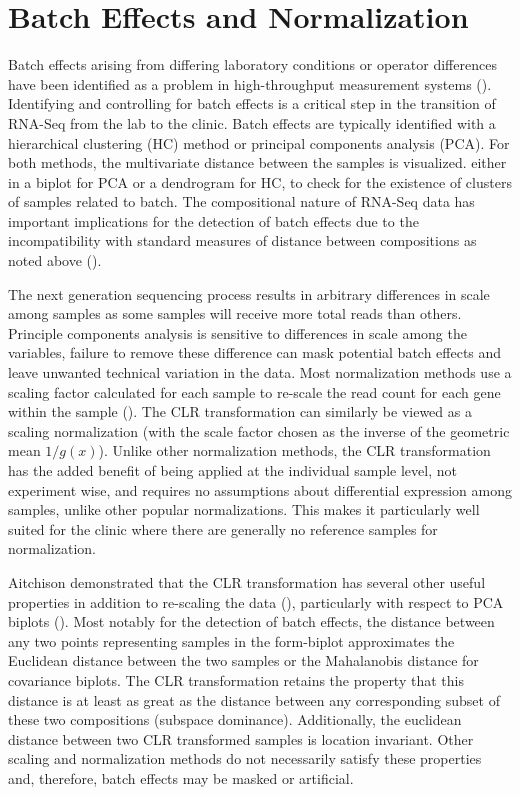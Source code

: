 \documentclass [10pt]{article}
\theoremstyle{definition}
\begin{document}
\FloatBarrier
\section{Batch Effects and Normalization}

Batch effects arising from differing laboratory conditions or operator differences have been identified as a problem in high-throughput measurement systems (\cite{leek2010, chen2011}).  Identifying and controlling for batch effects is a critical step in the transition of RNA-Seq from the lab to the clinic.  Batch effects are typically identified with a hierarchical clustering (HC) method or principal components analysis (PCA).  For both methods, the multivariate distance between the samples is visualized. either in a biplot for PCA or a dendrogram for HC, to check for the existence of clusters of samples related to batch. %
The compositional nature of RNA-Seq data has important implications for the detection of batch effects due to the incompatibility with standard measures of distance between compositions as noted above (\cite{Aitchison1986,Martin-Fernandez1998}).

The next generation sequencing process results in arbitrary differences in scale among samples as some samples will receive more total reads than others. Principle components analysis is sensitive to differences in scale among the variables, failure to remove these difference can mask potential batch effects and leave unwanted technical variation in the data.  Most normalization methods use a scaling factor calculated for each sample to re-scale the read count for each gene within the sample (\cite{Dillies2013}).  The CLR transformation can similarly be viewed as a scaling normalization (with the scale factor chosen as the inverse of the geometric mean $1/g(x)$).  Unlike other normalization methods, the CLR transformation has the added benefit of being applied at the individual sample level, not experiment wise, and requires no assumptions about differential expression among samples, unlike other popular normalizations.  This makes it particularly well suited for the clinic where there are generally no reference samples for normalization.

Aitchison demonstrated that the CLR transformation has several other useful properties in addition to re-scaling the data (\cite{Aitchison1986}), particularly with respect to PCA biplots (\cite{Aitchison2002}).  Most notably for the detection of batch effects, the distance between any two points representing samples in the form-biplot approximates the Euclidean distance between the two samples or the Mahalanobis distance for covariance biplots.  The CLR transformation retains the property that this distance is at least as great as the distance between any corresponding subset of these two compositions (subspace dominance).  Additionally, the euclidean distance between two CLR transformed samples is location invariant. Other scaling and normalization methods do not necessarily satisfy these properties and, therefore, batch effects may be masked or artificial.
\end{document}
